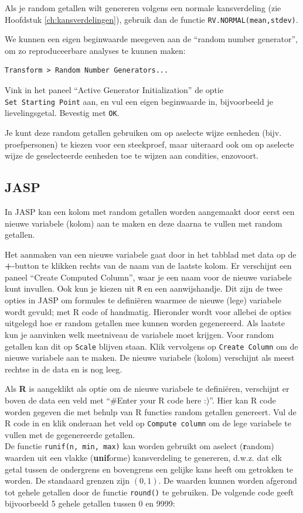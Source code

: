 \documentclass[
]{book}
\begin{document}
Als je random getallen wilt genereren volgens een normale kansverdeling (zie Hoofdstuk \ref{ch:kansverdelingen}), gebruik dan de functie \texttt{RV.NORMAL(mean,stdev)}.

We kunnen een eigen beginwaarde meegeven aan de ``random number generator'', om zo reproduceerbare analyses te kunnen maken:

\begin{verbatim}
Transform > Random Number Generators...
\end{verbatim}

Vink in het paneel ``Active Generator Initialization'' de optie \texttt{Set\ Starting\ Point} aan, en vul een eigen beginwaarde in, bijvoorbeeld je lievelingsgetal. Bevestig met \texttt{OK}.

Je kunt deze random getallen gebruiken om op aselecte wijze eenheden (bijv. proefpersonen) te kiezen voor een steekproef, maar uiteraard ook om op aselecte wijze de geselecteerde eenheden toe te wijzen aan condities, enzovoort.

\hypertarget{jasp}{%
\subsection{JASP}\label{jasp}}

In JASP kan een kolom met random getallen worden aangemaakt door eerst een nieuwe variabele (kolom) aan te maken en deze daarna te vullen met random getallen.

Het aanmaken van een nieuwe variabele gaat door in het tabblad met data op de \textbf{+}-button te klikken rechts van de naam van de laatste kolom. Er verschijnt een paneel ``Create Computed Column'', waar je een naam voor de nieuwe variabele kunt invullen. Ook kun je kiezen uit \texttt{R} en een aanwijshandje. Dit zijn de twee opties in JASP om formules te definiëren waarmee de nieuwe (lege) variabele wordt gevuld; met R code of handmatig. Hieronder wordt voor allebei de opties uitgelegd hoe er random getallen mee kunnen worden gegenereerd. Als laatste kun je aanvinken welk meetniveau de variabele moet krijgen. Voor random getallen kan dit op \texttt{Scale} blijven staan. Klik vervolgens op \texttt{Create\ Column} om de nieuwe variabele aan te maken. De nieuwe variabele (kolom) verschijnt als meest rechtse in de data en is nog leeg.

Als \textbf{R} is aangeklikt als optie om de nieuwe variabele te definiëren, verschijnt er boven de data een veld met ``\#Enter your R code here :)''. Hier kan R code worden gegeven die met behulp van R functies random getallen genereert. Vul de R code in en klik onderaan het veld op \texttt{Compute\ column} om de lege variabele te vullen met de gegenereerde getallen.\\
De functie \texttt{runif(n,\ min,\ max)} kan worden gebruikt om aselect (\textbf{r}andom) waarden uit een vlakke (\textbf{unif}orme) kansverdeling te genereren, d.w.z. dat elk getal tussen de ondergrens en bovengrens een gelijke kans heeft om getrokken te worden. De standaard grenzen zijn \((0,1)\). De waarden kunnen worden afgerond tot gehele getallen door de functie \texttt{round()} te gebruiken. De volgende code geeft bijvoorbeeld 5 gehele getallen tussen 0 en 9999:
\end{document}
